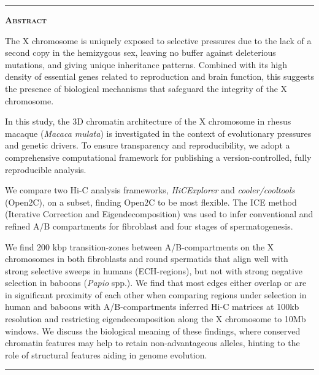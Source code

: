 \documentclass[
  11pt,
  a4paper,
]{scrbook}
\begin{document}
{\vspace*{\fill} %
\noindent
\begin{minipage}{.8\textwidth}
    \centering
    \hspace*{\fill}\rule{0.5\textwidth}{0.4pt}\hspace*{\fill} %
    \par \vspace{2em} %
    {\Large\bfseries\scshape Abstract} %
    \par %
    \vspace{1em} %
    \justifying %
    The X chromosome is uniquely exposed to selective pressures due to
the lack of a second copy in the hemizygous sex, leaving no buffer
against deleterious mutations, and giving unique inheritance patterns.
Combined with its high density of essential genes related to
reproduction and brain function, this suggests the presence of
biological mechanisms that safeguard the integrity of the X chromosome.

In this study, the 3D chromatin architecture of the X chromosome in
rhesus macaque (\emph{Macaca mulata}) is investigated in the context of
evolutionary pressures and genetic drivers. To ensure transparency and
reproducibility, we adopt a comprehensive computational framework for
publishing a version-controlled, fully reproducible analysis.

We compare two Hi-C analysis frameworks, \emph{HiCExplorer} and
\emph{cooler/cooltools} (Open2C), on a subset, finding Open2C to be most
flexible. The ICE method (Iterative Correction and Eigendecomposition)
was used to infer conventional and refined A/B compartments for
fibroblast and four stages of spermatogenesis.

We find 200 kbp transition-zones between A/B-compartments on the X
chromosomes in both fibroblasts and round spermatids that align well
with strong selective sweeps in humans (ECH-regions), but not with
strong negative selection in baboons (\emph{Papio} spp.). We find that
most edges either overlap or are in significant proximity of each other
when comparing regions under selection in human and baboons with
A/B-compartments inferred Hi-C matrices at 100kb resolution and
restricting eigendecomposition along the X chromosome to 10Mb windows.
We discuss the biological meaning of these findings, where conserved
chromatin features may help to retain non-advantageous alleles, hinting
to the role of structural features aiding in genome
evolution. %
    \par %
    \vspace{2em} %
    \hspace*{\fill}\rule{0.5\textwidth}{0.4pt}\hspace*{\fill} %
\end{minipage}
\vspace*{\fill} %

}
\end{document}
